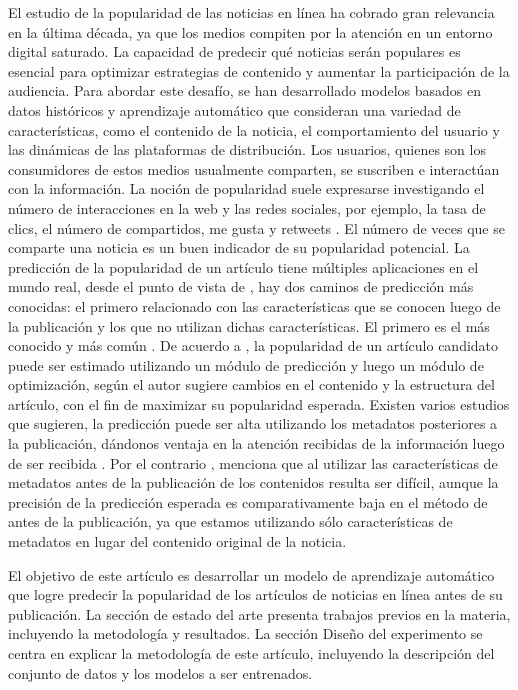\documentclass[
  number,
  preprint,
  3p,
  twocolumn]{elsarticle}
\begin{document}
El estudio de la popularidad de las noticias en línea ha cobrado gran
relevancia en la última década, ya que los medios compiten por la
atención en un entorno digital saturado. La capacidad de predecir qué
noticias serán populares es esencial para optimizar estrategias de
contenido y aumentar la participación de la audiencia. Para abordar este
desafío, se han desarrollado modelos basados en datos históricos y
aprendizaje automático que consideran una variedad de características,
como el contenido de la noticia, el comportamiento del usuario y las
dinámicas de las plataformas de distribución. Los usuarios, quienes son
los consumidores de estos medios usualmente comparten, se suscriben e
interactúan con la información. La noción de popularidad suele
expresarse investigando el número de interacciones en la web y las redes
sociales, por ejemplo, la tasa de clics, el número de compartidos, me
gusta y retweets \citep{uddin2016}. El número de veces que se comparte
una noticia es un buen indicador de su popularidad potencial. La
predicción de la popularidad de un artículo tiene múltiples aplicaciones
en el mundo real, desde el punto de vista de \citep{tatar2014a}, hay dos
caminos de predicción más conocidas: el primero relacionado con las
características que se conocen luego de la publicación y los que no
utilizan dichas características. El primero es el más conocido y más
común
\citep{kaltenbrunner2007, szabo2010, lee2012, ahmed2013, tatar2014b}. De
acuerdo a \citep{fernandes2015}, la popularidad de un artículo candidato
puede ser estimado utilizando un módulo de predicción y luego un módulo
de optimización, según el autor sugiere cambios en el contenido y la
estructura del artículo, con el fin de maximizar su popularidad
esperada. Existen varios estudios que sugieren, la predicción puede ser
alta utilizando los metadatos posteriores a la publicación, dándonos
ventaja en la atención recibidas de la información luego de ser recibida
\citep{lee2012, ahmed2013}. Por el contrario \citep{fernandes2015},
menciona que al utilizar las características de metadatos antes de la
publicación de los contenidos resulta ser difícil, aunque la precisión
de la predicción esperada es comparativamente baja en el método de antes
de la publicación, ya que estamos utilizando sólo características de
metadatos en lugar del contenido original de la noticia.

El objetivo de este artículo es desarrollar un modelo de aprendizaje
automático que logre predecir la popularidad de los artículos de
noticias en línea antes de su publicación. La sección de estado del arte
presenta trabajos previos en la materia, incluyendo la metodología y
resultados. La sección Diseño del experimento se centra en explicar la
metodología de este artículo, incluyendo la descripción del conjunto de
datos y los modelos a ser entrenados.
\end{document}
